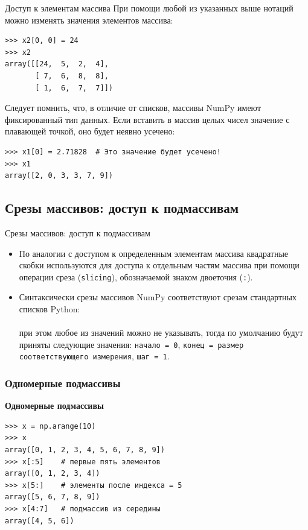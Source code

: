\documentclass[aspectratio=169, mathserif]{beamer}	%
\begin{document}
\begin{frame}[fragile]{Доступ к элементам массива}
\scriptsize
При помощи любой из указанных выше нотаций можно изменять значения элементов массива:

\begin{verbatim}
>>> x2[0, 0] = 24
>>> x2
array([[24,  5,  2,  4],
       [ 7,  6,  8,  8],
       [ 1,  6,  7,  7]])
\end{verbatim}

Следует помнить, что, в отличие от списков, массивы NumPy имеют фиксированный тип данных. 
Если вставить в массив целых чисел значение с плавающей точкой, оно будет неявно усечено:

\begin{verbatim}
>>> x1[0] = 2.71828  # Это значение будет усечено!
>>> x1
array([2, 0, 3, 3, 7, 9])
\end{verbatim}
\vfill
\end{frame}

\subsection{Срезы массивов: доступ к подмассивам}
\begin{frame}[fragile]{Срезы массивов: доступ к подмассивам}
\scriptsize
\begin{itemize}
\item По аналогии с доступом к определенным элементам массива квадратные скобки используются для доступа к отдельным частям массива при помощи операции среза (\texttt{slicing}), обозначаемой знаком двоеточия (\texttt{:}).
\item Синтаксически срезы массивов NumPy соответствуют  срезам стандартных списков Python:
\\

\\ 
\noindent при этом любое из значений можно не указывать, тогда по умолчанию будут приняты следующие значения: \texttt{начало = 0}, \texttt{конец = размер соответствующего измерения}, \texttt{шаг = 1}.
\end{itemize} 
\subsubsection{Одномерные подмассивы} 
\begin{alertblock}{\textbf{Одномерные подмассивы}}
\begin{verbatim}
>>> x = np.arange(10)
>>> x
array([0, 1, 2, 3, 4, 5, 6, 7, 8, 9])
>>> x[:5]    # первые пять элементов
array([0, 1, 2, 3, 4])
>>> x[5:]    # элементы после индекса = 5
array([5, 6, 7, 8, 9])
>>> x[4:7]   # подмассив из середины
array([4, 5, 6])
\end{verbatim}
\end{alertblock}
\vfil
\end{frame}
\end{document}
